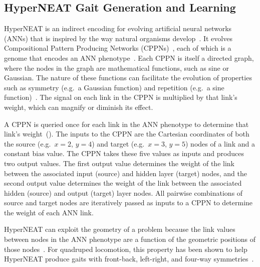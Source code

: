 \subsection{HyperNEAT Gait Generation and Learning}
    
HyperNEAT is an indirect encoding for evolving artificial neural
networks (ANNs) that is inspired by the way natural organisms
develop~\citep{stanley2009hypercube}. It evolves Compositional Pattern
Producing Networks (CPPNs)~\citep{stanley2007compositional}, each of
which is a genome that encodes an ANN
phenotype~\citep{stanley2009hypercube}. Each CPPN is itself a directed
graph, where the nodes in the graph are mathematical functions, such as sine or
Gaussian. The nature of these functions can facilitate the evolution
of properties such as symmetry (e.g.\ a Gaussian function) and repetition (e.g.\ a sine
function)~\citep{stanley2009hypercube, stanley2007compositional}. The
signal on each link in the CPPN is multiplied by that link's weight,
which can magnify or diminish its effect.
  
A CPPN is queried once for each link in the ANN phenotype to determine
that link's weight~(). The inputs to the CPPN are the Cartesian
coordinates of both the source (e.g.\ $x = 2$, $y = 4$) and target
(e.g.\ $x = 3$, $y = 5$) nodes of a link and a constant bias
value. The CPPN takes these five values as inputs and produces two output values. The first output value
determines the weight of the link between the associated input
(source) and hidden layer (target) nodes, and the second output value
determines the weight of the link between the associated hidden
(source) and output (target) layer nodes. All pairwise combinations of
source and target nodes are iteratively passed as inputs to a CPPN to
determine the weight of each ANN link.


HyperNEAT can exploit the geometry of a problem because
the link values between nodes in the ANN phenotype are a
function of the geometric positions of those nodes~\citep{stanley2009hypercube, clune2009sensitivity,
  clune2011performance}. For quadruped locomotion, this
property has been shown to help HyperNEAT produce gaits with front-back, left-right,
and four-way symmetries~\citep{clune2009evolving,
  clune2011performance}.
  
